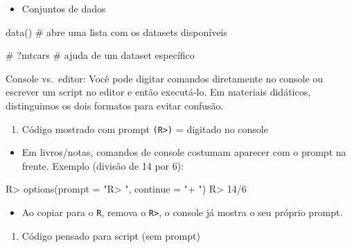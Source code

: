 \documentclass[
  letterpaper,
  DIV=11,
  numbers=noendperiod]{scrreprt}
\newenvironment{Shaded}{\begin{snugshade}}{\end{snugshade}}
\newcommand{\AttributeTok}[1]{\textcolor[rgb]{0.40,0.45,0.13}{#1}}
\newcommand{\CommentTok}[1]{\textcolor[rgb]{0.37,0.37,0.37}{#1}}
\newcommand{\DecValTok}[1]{\textcolor[rgb]{0.68,0.00,0.00}{#1}}
\newcommand{\FunctionTok}[1]{\textcolor[rgb]{0.28,0.35,0.67}{#1}}
\newcommand{\NormalTok}[1]{\textcolor[rgb]{0.00,0.23,0.31}{#1}}
\newcommand{\SpecialCharTok}[1]{\textcolor[rgb]{0.37,0.37,0.37}{#1}}
\newcommand{\StringTok}[1]{\textcolor[rgb]{0.13,0.47,0.30}{#1}}
\providecommand{\tightlist}{%
  \setlength{\itemsep}{0pt}\setlength{\parskip}{0pt}}\usepackage{longtable,booktabs,array}
\begin{document}
\begin{itemize}
\tightlist
\item
  Conjuntos de dados
\end{itemize}

\begin{Shaded}
\begin{Highlighting}[]
\FunctionTok{data}\NormalTok{() }\CommentTok{\# abre uma lista com os datasets disponíveis}

\CommentTok{\# ?mtcars   \# ajuda de um dataset específico}
\end{Highlighting}
\end{Shaded}

Console vs.~editor: Você pode digitar comandos diretamente no console ou
escrever um script no editor e então executá-lo. Em materiais didáticos,
distinguimos os dois formatos para evitar confusão.

\begin{enumerate}
\def\labelenumi{\arabic{enumi})}
\tightlist
\item
  Código mostrado com prompt \texttt{(R\textgreater{})} = digitado no
  console
\end{enumerate}

\begin{itemize}
\tightlist
\item
  Em livros/notas, comandos de console costumam aparecer com o prompt na
  frente. Exemplo (divisão de 14 por 6):
\end{itemize}

\begin{Shaded}
\begin{Highlighting}[]
\NormalTok{R}\SpecialCharTok{\textgreater{}} \FunctionTok{options}\NormalTok{(}\AttributeTok{prompt =} \StringTok{"R\textgreater{} "}\NormalTok{, }\AttributeTok{continue =} \StringTok{"+ "}\NormalTok{)}
\NormalTok{R}\SpecialCharTok{\textgreater{}} \DecValTok{14}\SpecialCharTok{/}\DecValTok{6}
\end{Highlighting}
\end{Shaded}

\begin{itemize}
\tightlist
\item
  Ao copiar para o \texttt{R}, remova o \texttt{R\textgreater{}}, o
  console já mostra o seu próprio prompt.
\end{itemize}

\begin{enumerate}
\def\labelenumi{\arabic{enumi})}
\setcounter{enumi}{1}
\tightlist
\item
  Código pensado para script (sem prompt)
\end{enumerate}
\end{document}
